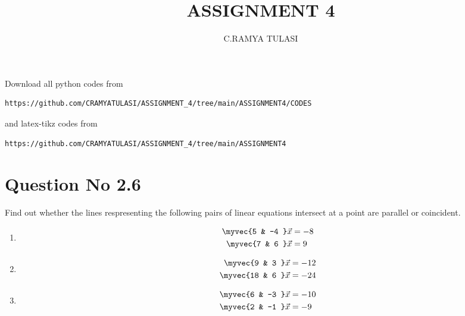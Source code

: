\documentclass[journal,12pt,twocolumn]{IEEEtran}
\begin{document}
     \def\rightbox#1{\makebox[0in][r]{#1}}
     \def\centbox#1{\makebox[0in]{#1}}
     \def\topbox#1{\raisebox{-\baselineskip}[0in][0in]{#1}}
     \def\midbox#1{\raisebox{-0.5\baselineskip}[0in][0in]{#1}}
\vspace{3cm}
\title{ASSIGNMENT 4}
\author{C.RAMYA TULASI}
\maketitle
\newpage
\bigskip
\renewcommand{\thefigure}{\theenumi}
\renewcommand{\thetable}{\theenumi}
Download all python codes from 
\begin{lstlisting}
https://github.com/CRAMYATULASI/ASSIGNMENT_4/tree/main/ASSIGNMENT4/CODES
\end{lstlisting}
%
and latex-tikz codes from 
%
\begin{lstlisting}
https://github.com/CRAMYATULASI/ASSIGNMENT_4/tree/main/ASSIGNMENT4
\end{lstlisting}
%
\section{Question No 2.6}
Find out whether the lines respresenting the following pairs of linear equations intersect at a point are parallel or coincident.
%
\begin{enumerate}
\item
\begin{align}
\begin{split}
\myvec{5 & -4 }\vec{x}&=-8
\\
\myvec{7 & 6 }\vec{x}&=9 \label{1.0.1}
\end{split}
\end{align}
\item
\begin{align}
\begin{split}
\myvec{9 & 3 }\vec{x}&=-12
\\
\myvec{18 & 6 }\vec{x}&=-24 \label{1.0.2}
\end{split}
\end{align}
\item
\begin{align}
\begin{split}
\myvec{6 & -3 }\vec{x}&=-10
\\
\myvec{2 & -1 }\vec{x}&=-9\label{1.0.3}
\end{split}
\end{align}
\end{enumerate}
%
\end{document}
